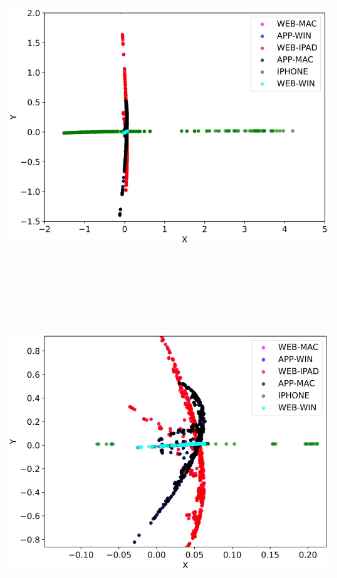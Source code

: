 \begingroup
    \centering
    \includegraphics[width=8.5cm, height=8.5cm, keepaspectratio]{Immagini/Isomap/isomap_sep_class.jpg}\includegraphics[width=8.5cm, height=8.5cm, keepaspectratio]{Immagini/Isomap/zoom_isomap_sep_class.jpg}\\\vspace{1em}
